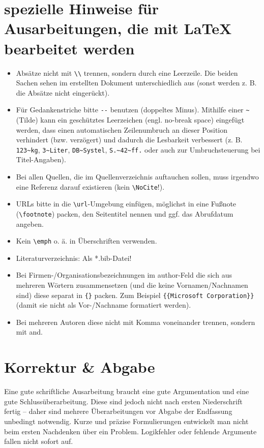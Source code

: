 \section{spezielle Hinweise für Ausarbeitungen, die mit LaTeX bearbeitet werden}

\begin{itemize}
\item Absätze nicht mit \verb|\\| trennen, sondern durch eine Leerzeile. Die beiden Sachen sehen im erstellten Dokument unterschiedlich aus (sonst werden z. B. die Absätze nicht eingerückt).
\item Für Gedankenstriche bitte \verb|--| benutzen (doppeltes Minus).
    Mithilfe einer \verb|~| (Tilde) kann ein geschütztes Leerzeichen (engl. no-break space) eingefügt werden, dass einen automatischen Zeilenumbruch an dieser Position verhindert (bzw. verzögert) und dadurch die Lesbarkeit verbessert (z. B. \verb|123~kg|, \verb|3~Liter|, \verb|DB~Systel|, \verb|S.~42~ff.| oder auch zur Umbruchsteuerung bei Titel-Angaben).
\item Bei allen Quellen, die im Quellenverzeichnis auftauchen sollen, muss irgendwo eine Referenz darauf existieren (kein \verb|\NoCite|!).
\item URLs bitte in die \verb|\url|-Umgebung einfügen, möglichst in eine Fußnote (\verb|\footnote|) packen, den Seitentitel nennen und ggf. das Abrufdatum angeben.
\item Kein \verb|\emph| o. ä. in Überschriften verwenden.
\item Literaturverzeichnis: Als *.bib-Datei!
\item Bei Firmen-/Organisationsbezeichnungen im author-Feld die sich aus mehreren Wörtern zusammensetzen (und die keine Vornamen/Nachnamen sind) diese separat in \verb|{}| packen. Zum Beispiel \verb|{{Microsoft Corporation}}| (damit sie nicht als Vor-/Nachname formatiert werden).
\item Bei mehreren Autoren diese nicht mit Komma voneinander trennen, sondern mit and.
\end{itemize}



\section{Korrektur \& Abgabe}

Eine gute schriftliche Ausarbeitung braucht eine gute Argumentation und eine gute Schlussüberarbeitung. Diese sind jedoch nicht nach ersten Niederschrift fertig -- daher sind mehrere Überarbeitungen vor Abgabe der Endfassung unbedingt notwendig. Kurze und präzise Formulierungen entwickelt man nicht beim ersten Nachdenken über ein Problem. Logikfehler oder fehlende Argumente fallen nicht sofort auf.

